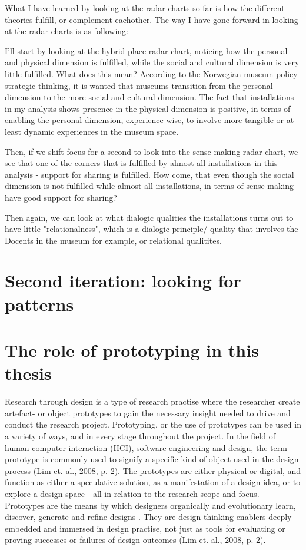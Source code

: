 What I have learned by looking at the radar charts so far is how the different theories fulfill, or complement eachother. The way I have gone forward in looking at the radar charts is as following:
\par I'll start by looking at the hybrid place radar chart, noticing how the personal and physical dimension is fulfilled, while the social and cultural dimension is very little fulfilled. What does this mean? According to the Norwegian museum policy strategic thinking, it is wanted that museums transition from the personal dimension to the more social and cultural dimension. The fact that installations in my analysis shows presence in the physical dimension is positive, in terms of enabling the personal dimension, experience-wise, to involve more tangible or at least dynamic experiences in the museum space.
\par Then, if we shift focus for a second to look into the sense-making radar chart, we see that one of the corners that is fulfilled by almost all installations in this analysis - support for sharing is fulfilled. How come, that even though the social dimension is not fulfilled while almost all installations, in terms of sense-making have good support for sharing? 

\par Then again, we can look at what dialogic qualities the installations turns out to have little "relationalness", which is a dialogic principle/ quality that involves the Docents in the museum for example, or relational qualitites.






\section{Second iteration: looking for patterns}


\section{The role of prototyping in this thesis}
Research through design is a type of research practise where the researcher create artefact- or object prototypes to gain the necessary insight needed to drive and conduct the research project. Prototyping, or the use of prototypes can be used in a variety of ways, and in every stage throughout the project. In the field of human-computer interaction (HCI), software engineering and design, the term prototype is commonly used to signify a specific kind of object used in the design process (Lim et. al., 2008, p. 2). The prototypes are either physical or digital, and function as either a speculative solution, as a manifestation of a design idea, or to explore a design space - all in relation to the research scope and focus. Prototypes are the means by which designers organically and evolutionary learn, discover, generate and refine designs \cite{lim_anatomy_2008, p.2}. They are design-thinking enablers deeply embedded and immersed in design practise, not just as tools for evaluating or proving successes or failures of design outcomes (Lim et. al., 2008, p. 2).

